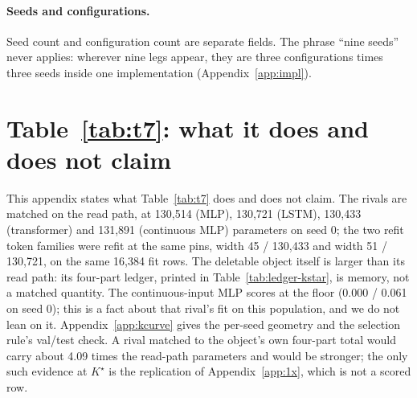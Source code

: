 \documentclass{article} %
\newcommand{\Kstar}{\ensuremath{K^{\star}}}
\begin{document}
\paragraph{Seeds and configurations.} Seed count and configuration count are separate fields. The
phrase ``nine seeds'' never applies: wherever nine legs appear, they are three configurations
times three seeds inside one implementation (Appendix~\ref{app:impl}).

\section{Table~\ref{tab:t7}: what it does and does not claim}
\label{app:t7more}
This appendix states what Table~\ref{tab:t7} does and does not claim. The rivals are matched on
the read path, at 130,514 (MLP), 130,721 (LSTM), 130,433 (transformer) and 131,891 (continuous MLP)
parameters on seed 0; the two refit token families were refit at the same pins, width 45 / 130,433 and
width 51 / 130,721, on the same 16,384 fit rows. %
The deletable object itself is larger than its read path: its four-part ledger, printed in
Table~\ref{tab:ledger-kstar}, is memory, not a matched quantity. The continuous-input MLP
scores at the floor (0.000 / 0.061 on seed 0); this is a fact about that rival's fit on this
population, and we do not lean on it. %
Appendix~\ref{app:kcurve} gives the per-seed geometry and the selection rule's val/test check.
A rival matched to the object's own four-part total would carry about 4.09 times the
read-path parameters and would be stronger; the only such evidence at $\Kstar$ is the
replication of Appendix~\ref{app:1x}, which is not a scored row. %
\end{document}
